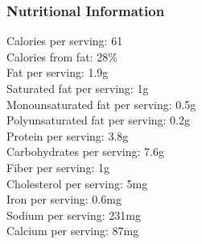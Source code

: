 \subsubsection{Nutritional Information}
Calories per serving:	61\\
Calories from fat:	28\%\\
Fat per serving:	1.9g\\
Saturated fat per serving:	1g\\
Monounsaturated fat per serving:	0.5g\\
Polyunsaturated fat per serving:	0.2g\\
Protein per serving:	3.8g\\
Carbohydrates per serving:	7.6g\\
Fiber per serving:	1g\\
Cholesterol per serving:	5mg\\
Iron per serving:	0.6mg\\
Sodium per serving:	231mg\\
Calcium per serving:	87mg
